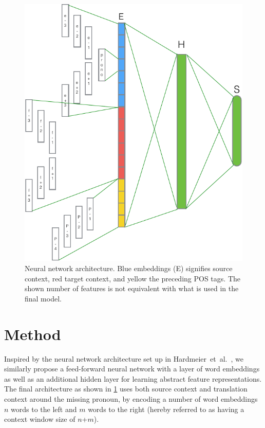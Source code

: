 \documentclass[11pt]{article}
\begin{document}
\begin{figure}[tbp]
    \centering
    \includegraphics[width=\columnwidth]{figures/nnarchitecture.pdf}
    \caption{Neural network architecture. Blue embeddings (E) signifies source context, red target context, and yellow the preceding POS tags. The shown number of features is not equivalent with what is used in the final model.}
    \label{fig:nnarchitecture}
\end{figure}

\section{Method}

Inspired by the neural network architecture set up in Hardmeier~et~al.~, we similarly propose a feed-forward neural network with a layer of word embeddings as well as an additional hidden layer for learning abstract feature representations.
The final architecture as shown in \cref{fig:nnarchitecture} uses both source context and translation context around the missing pronoun, by encoding a number of word embeddings $n$ words to the left and $m$ words to the right (hereby referred to as having a context window size of $n$+$m$).
\end{document}
